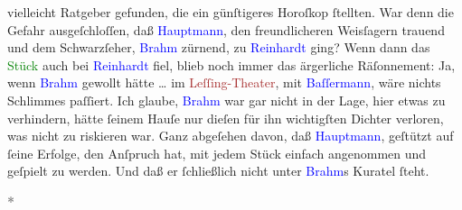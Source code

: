 {{                  vielleicht Ratgeber gefunden, die ein günſtigeres Horoſkop ſtellten. War denn die
                  Gefahr ausgeſchloſſen, daß \textcolor{blue}{Hauptmann}{}\ledrightnote{\textcolor{blue}{Gerhart Hauptmann}}, den
                  freundlicheren Weisſagern trauend und dem Schwarzſeher, \textcolor{blue}{Brahm}{}\ledrightnote{\textcolor{blue}{Otto Brahm}} zürnend, zu \textcolor{blue}{Reinhardt}{}\ledrightnote{\textcolor{blue}{Max Reinhardt}} ging? Wenn dann das \textcolor{green}{Stück}{}\ledrightnote{{$\rightarrow$}\textcolor{green}{Die Jungfern vom Bischofsberg. Lustspiel}} auch bei \textcolor{blue}{Reinhardt}{}\ledrightnote{\textcolor{blue}{Max Reinhardt}} fiel, blieb noch immer das ärgerliche Räſonnement: Ja, wenn \textcolor{blue}{Brahm}{}\ledrightnote{\textcolor{blue}{Otto Brahm}} gewollt hätte {\dots} im \textcolor{brown}{Leſſing-Theater}{}\ledrightnote{\textcolor{brown}{Lessing-Theater}}, mit \textcolor{blue}{Baſſermann}{}\ledrightnote{\textcolor{blue}{Albert Bassermann}}, wäre nichts Schlimmes paſſiert.
                  Ich glaube, \textcolor{blue}{Brahm}{}\ledrightnote{\textcolor{blue}{Otto Brahm}} war gar nicht in der
                  Lage, hier etwas zu verhindern, hätte ſeinem Hauſe nur dieſen für ihn wichtigſten
                  Dichter verloren, was nicht zu riskieren war. Ganz abgeſehen davon, daß \textcolor{blue}{Hauptmann}{}\ledrightnote{\textcolor{blue}{Gerhart Hauptmann}}, geſtützt auf ſeine Erfolge, den
                  Anſpruch hat, mit jedem Stück einfach angenommen und geſpielt zu werden. Und daß
                  er ſchließlich nicht unter \textcolor{blue}{Brahm}{}\ledrightnote{\textcolor{blue}{Otto Brahm}}s Kuratel
                  ſteht.}}\pend
           
\pstart
           \centering{}\textcolor{gray}{\textbf{*}}\pend
           
